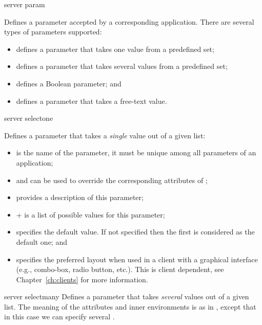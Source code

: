 \bigskip
\xmlstruct
{server}
{param}
{%
%
  Defines a parameter accepted by a corresponding application. There
  are several types of parameters supported:
\begin{itemize}
\item {} defines a parameter that takes one
  value from a predefined set;
\item {} defines a parameter that takes several
  values from a predefined set;
\item {} defines a Boolean parameter; and
\item {} defines a parameter that takes a
  free-text value.
\end{itemize}
%
}


\bigskip
\xmlstruct
{server}
{selectone}
{%
%
  Defines a parameter that takes a \emph{single} value out of a given
  list:

  \begin{itemize}
  \item {} is the name of the parameter, it must be
    unique among all parameters of an application;

  \item {} and  can be used
    to override the corresponding attributes of
    ;

  \item {} provides a description of this parameter;

  \item {}+ is a list of possible values for
    this parameter;

  \item {} specifies the default value. If
    not specified then the first  is considered
    as the default one; and

  \item {} specifies the preferred layout when
    used in a client with a graphical interface (e.g., combo-box,
    radio button, etc.). This is client dependent, see
    Chapter~\ref{ch:clients} for more information.

  \end{itemize}
%
}


\bigskip
\xmlstruct
{server}
{selectmany}
{%
%
  Defines a parameter that takes \emph{several} values out of a given
  list. The meaning of the attributes and inner environments is as in
  , except that in this case we can specify
  several  .
%
}


